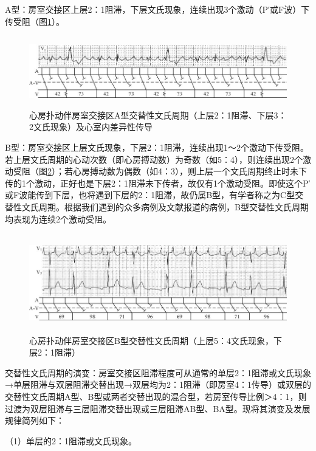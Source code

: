 A型：房室交接区上层2：1阻滞，下层文氏现象，连续出现3个激动（P′或F波）下传受阻（图\ref{fig24-1}）。

\begin{figure}[!htbp]
 \centering
 \includegraphics[width=5.80208in,height=1.20833in]{./images/Image00396.jpg}
 \captionsetup{justification=centering}
 \caption{心房扑动伴房室交接区A型交替性文氏周期（上层2：1阻滞、下层3：2文氏现象）及心室内差异性传导}
 \label{fig24-1}
  \end{figure} 

B型：房室交接区上层文氏现象，下层2：1阻滞，连续出现1～2个激动下传受阻。若上层文氏周期的心动次数（即心房搏动数）为奇数（如5：4），则连续出现2个激动受阻（图\ref{fig24-2}）；若心房搏动数为偶数（如4：3），则上层一个文氏周期终止时未下传的1个激动，正好也是下层2：1阻滞未下传者，故仅有1个激动受阻。即使这个P′或F波能传到下层，也将遇到下层的2：1阻滞，故仍属B型，有学者称之为C型交替性文氏周期。根据我们遇到的众多病例及文献报道的病例，B型交替性文氏周期均表现为连续2个激动受阻。

\begin{figure}[!htbp]
 \centering
 \includegraphics[width=5.80208in,height=1.6875in]{./images/Image00397.jpg}
 \captionsetup{justification=centering}
 \caption{心房扑动伴房室交接区B型交替性文氏周期（上层5：4文氏现象，下层2：1阻滞）}
 \label{fig24-2}
  \end{figure} 

交替性文氏周期的演变：房室交接区阻滞程度可从通常的单层2：1阻滞或文氏现象→单层阻滞与双层阻滞交替出现→双层均为2：1阻滞（即房室4：1传导）或双层的交替性文氏周期A型、B型或两者交替出现的混合型，若房室传导比例＞4：1，则过渡为双层阻滞与三层阻滞交替出现或三层阻滞AB型、BA型。现将其演变及发展规律简列如下：

（1）单层的2：1阻滞或文氏现象。

